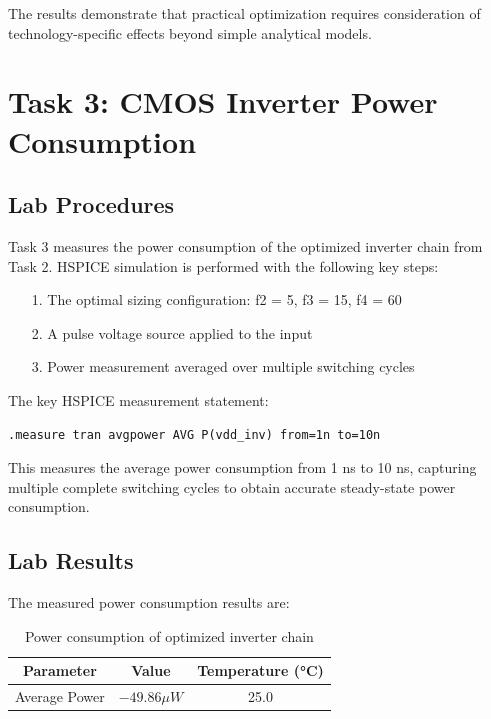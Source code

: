 \documentclass[UTF8,12pt,a4paper]{ctexart}
\begin{document}
The results demonstrate that practical optimization requires consideration of technology-specific effects beyond simple analytical models.

\newpage
\section{Task 3: CMOS Inverter Power Consumption}

\subsection{Lab Procedures}

Task 3 measures the power consumption of the optimized inverter chain from Task 2. HSPICE simulation is performed with the following key steps:

\begin{enumerate}
    \item[1. ] The optimal sizing configuration: f2 = 5, f3 = 15, f4 = 60
    \item[2. ] A pulse voltage source applied to the input
    \item[3. ] Power measurement averaged over multiple switching cycles
\end{enumerate}

The key HSPICE measurement statement:

\begin{lstlisting}
.measure tran avgpower AVG P(vdd_inv) from=1n to=10n
\end{lstlisting}

This measures the average power consumption from 1 ns to 10 ns, capturing multiple complete switching cycles to obtain accurate steady-state power consumption.

\subsection{Lab Results}

The measured power consumption results are:

\begin{table}[h]
\centering
\begin{tabular}{ccc}
\toprule
\textbf{Parameter} & \textbf{Value} & \textbf{Temperature (°C)} \\
\midrule
Average Power & $-49.86 \mu W$ & 25.0 \\
\bottomrule
\end{tabular}
\caption{Power consumption of optimized inverter chain}
\end{table}
\end{document}
